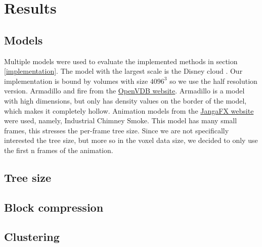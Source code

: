 \section{Results} \label{results}

\subsection{Models} \label{results:models}
Multiple models were used to evaluate the implemented methods in section \ref{implementation}. The model with the largest scale is the Disney cloud \cite{DisneyCloud}. Our implementation is bound by volumes with size $4096^3$ so we use the half resolution version. Armadillo and fire from the \href{https://www.openvdb.org/download/}{OpenVDB website}. Armadillo is a model with high dimensions, but only has density values on the border of the model, which makes it completely hollow. Animation models from the \href{https://jangafx.com/software/embergen/download/free-vdb-animations/}{JangaFX website} were used, namely, Industrial Chimney Smoke. This model has many small frames, this stresses the per-frame tree size. Since we are not specifically interested the tree size, but more so in the voxel data size, we decided to only use the first n frames of the animation.

\subsection{Tree size} \label{results:tree_size}
\subsection{Block compression} \label{results:block_compression}

\begin{figure}[H]
    \centering

    \caption{} \label{fig:implementation:compression:bc}
\end{figure}
\subsection{Clustering} \label{results:clustering}


